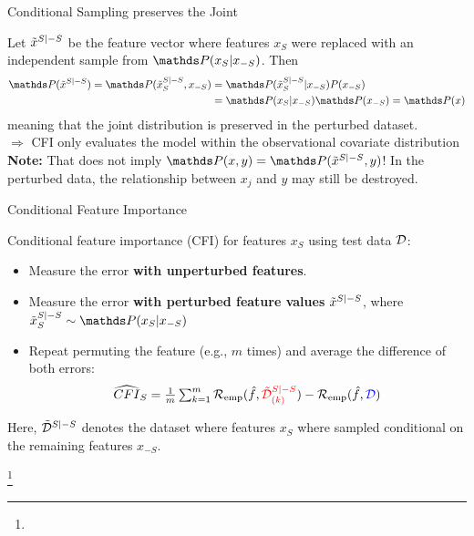 \documentclass[11pt,compress,t,notes=noshow, aspectratio=169, xcolor=table]{beamer}
\begin{document}
 
 \begin{vbframe}{Conditional Sampling preserves the Joint}
 
 Let $\pert{x}{S}{-S}$ be the feature vector where features $x_S$ were replaced with an independent sample from $\P(x_S|x_{-S})$. Then
%
\begin{align*}
  \P(\pert{x}{S}{-S}) = \P(\pert{x}{S}{-S}_S, x_{-S}) &= \P(\pert{x}{S}{-S}_S|x_{-S}) P(x_{-S})\\
   &= \P(x_S|x_{-S}) \P(x_{-S}) = \P(x)
\end{align*}
 meaning that the joint distribution is preserved in the perturbed dataset.\\
 $\Rightarrow$ CFI only evaluates the model within the observational covariate distribution\\
 \lz
 \textbf{Note:} That does not imply $\P(x,y) = \P(\pert{x}{S}{-S}, y)$! In the perturbed data, the relationship between $x_j$ and $y$ may still be destroyed.\\
 \end{vbframe}



\begin{vbframe}{Conditional Feature Importance}
\normalsize

Conditional feature importance (CFI) for features $x_S$ using test data $\D$:
\begin{itemize}
  \item Measure the error \color{blue}\textbf{with unperturbed features}\color{black}.
  \item Measure the error \color{red}\textbf{with perturbed feature values} \color{black} $\pert{x}{S}{-S}$, where $\pert{x}{S}{-S}_S \sim \P(x_S|x_{-S})$
  \item Repeat permuting the feature (e.g., $m$ times) and average the difference of both errors: 
$$\widehat{CFI}_S = \tfrac{1}{m} \textstyle\sum\nolimits_{k = 1}^{m} \riske (\fh, {\color{red}\pert{\D}{S}{-S}_{(k)}}) - \riske (\fh, {\color{blue}\D})$$
\end{itemize}

Here, $\pert{\D}{S}{-S}$ denotes the dataset where features $x_S$ where sampled conditional on the remaining features $x_{-S}$.

\footnote[frame]{}

\end{vbframe}
\end{document}
